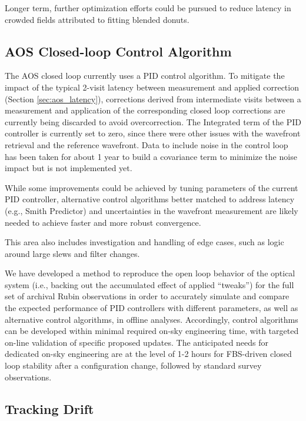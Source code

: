 \documentclass[SO,lsst,authoryear,toc]{lsstdoc}
\begin{document}
Longer term, further optimization efforts could be pursued to reduce latency in crowded fields attributed to fitting blended donuts.

\subsection{AOS Closed-loop Control Algorithm}
\label{sec:aos_control}

The AOS closed loop currently uses a PID control algorithm.
To mitigate the impact of the typical 2-visit latency between measurement and applied correction (Section \ref{sec:aos_latency}), corrections derived from intermediate visits between a measurement and application of the corresponding closed loop corrections are currently being discarded to avoid overcorrection.
The Integrated term of the PID controller is currently set to zero, since there were other issues with the wavefront retrieval and the reference wavefront.
Data to include noise in the control loop has been taken for about 1 year to build a covariance term to minimize the noise impact but is not implemented yet.

While some improvements could be achieved by tuning parameters of the current PID controller, alternative control algorithms better matched to address latency (e.g., Smith Predictor) and uncertainties in the wavefront measurement are likely needed to achieve faster and more robust convergence.

This area also includes investigation and handling of edge cases, such as logic around large slews and filter changes.

We have developed a method to reproduce the open loop behavior of the optical system (i.e., backing out the accumulated effect of applied ``tweaks'') for the full set of archival Rubin observations in order to accurately simulate and compare the expected performance of PID controllers with different parameters, as well as alternative control algorithms, in offline analyses.
Accordingly, control algorithms can be developed within minimal required on-sky engineering time, with targeted on-line validation of specific proposed updates.
The anticipated needs for dedicated on-sky engineering are at the level of 1-2 hours for FBS-driven closed loop stability after a configuration change, followed by standard survey observations.

\subsection{Tracking Drift}
\label{sec:tracking}
\end{document}
